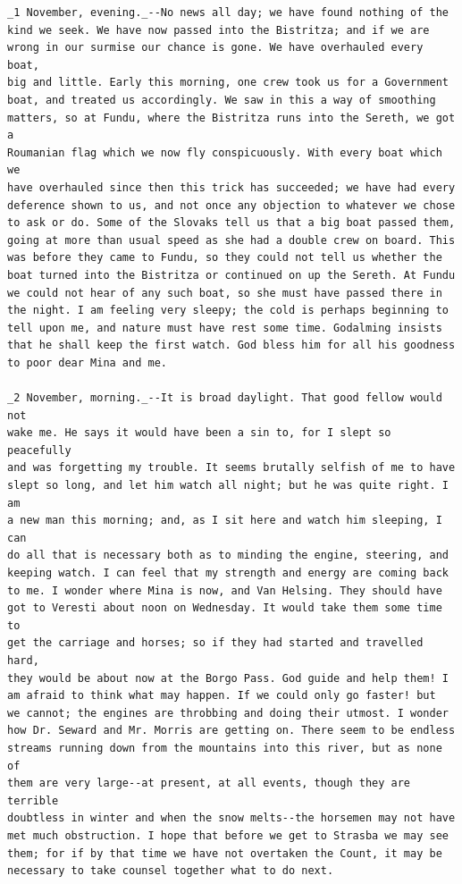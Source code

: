 \documentclass{article}
\begin{document}
\begin{verbatim}
_1 November, evening._--No news all day; we have found nothing of the
kind we seek. We have now passed into the Bistritza; and if we are
wrong in our surmise our chance is gone. We have overhauled every boat,
big and little. Early this morning, one crew took us for a Government
boat, and treated us accordingly. We saw in this a way of smoothing
matters, so at Fundu, where the Bistritza runs into the Sereth, we got a
Roumanian flag which we now fly conspicuously. With every boat which we
have overhauled since then this trick has succeeded; we have had every
deference shown to us, and not once any objection to whatever we chose
to ask or do. Some of the Slovaks tell us that a big boat passed them,
going at more than usual speed as she had a double crew on board. This
was before they came to Fundu, so they could not tell us whether the
boat turned into the Bistritza or continued on up the Sereth. At Fundu
we could not hear of any such boat, so she must have passed there in
the night. I am feeling very sleepy; the cold is perhaps beginning to
tell upon me, and nature must have rest some time. Godalming insists
that he shall keep the first watch. God bless him for all his goodness
to poor dear Mina and me.

_2 November, morning._--It is broad daylight. That good fellow would not
wake me. He says it would have been a sin to, for I slept so peacefully
and was forgetting my trouble. It seems brutally selfish of me to have
slept so long, and let him watch all night; but he was quite right. I am
a new man this morning; and, as I sit here and watch him sleeping, I can
do all that is necessary both as to minding the engine, steering, and
keeping watch. I can feel that my strength and energy are coming back
to me. I wonder where Mina is now, and Van Helsing. They should have
got to Veresti about noon on Wednesday. It would take them some time to
get the carriage and horses; so if they had started and travelled hard,
they would be about now at the Borgo Pass. God guide and help them! I
am afraid to think what may happen. If we could only go faster! but
we cannot; the engines are throbbing and doing their utmost. I wonder
how Dr. Seward and Mr. Morris are getting on. There seem to be endless
streams running down from the mountains into this river, but as none of
them are very large--at present, at all events, though they are terrible
doubtless in winter and when the snow melts--the horsemen may not have
met much obstruction. I hope that before we get to Strasba we may see
them; for if by that time we have not overtaken the Count, it may be
necessary to take counsel together what to do next.



\end{verbatim}
\end{document}
